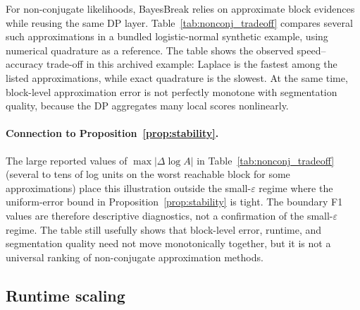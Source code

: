 For non-conjugate likelihoods, BayesBreak relies on approximate block evidences while reusing the
same DP layer. Table~\ref{tab:nonconj_tradeoff} compares several such approximations in a bundled
logistic-normal synthetic example, using numerical quadrature as a reference. The table shows the
observed speed--accuracy trade-off in this archived example: Laplace is the fastest among the listed approximations, while exact quadrature is the slowest. At the same time, block-level approximation error
is not perfectly monotone with segmentation quality, because the DP aggregates many local scores
nonlinearly.

\begin{table}[H]
    \centering
    
    \caption{Approximation trade-offs for a non-conjugate Bernoulli/logistic block model. Quadrature is used as the local reference block integral; the remaining methods trade block-level fidelity against computational cost.}
    \label{tab:nonconj_tradeoff}
\end{table}

\paragraph{Connection to Proposition~\ref{prop:stability}.}
The large reported values of $\max|\Delta\log A|$ in Table~\ref{tab:nonconj_tradeoff} (several to
tens of log units on the worst reachable block for some approximations) place this illustration outside the small-$\varepsilon$ regime where the uniform-error
bound in Proposition~\ref{prop:stability} is tight.
The boundary F1 values are therefore descriptive diagnostics, not a confirmation of the
small-$\varepsilon$ regime. The table still usefully shows that block-level error, runtime, and
segmentation quality need not move monotonically together, but it is not a universal ranking of
non-conjugate approximation methods.

\subsection{Runtime scaling}

